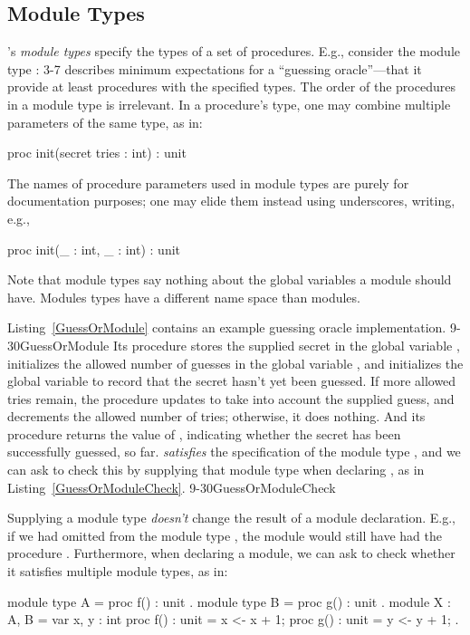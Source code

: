 \subsection{Module Types}

\EasyCrypt's \emph{module types} specify the types of a set of
procedures.  E.g., consider the module type  :
 {3-7}{}  describes
minimum expectations for a ``guessing oracle''---that it provide at
least procedures with the specified types.  The order of the
procedures in a module type is irrelevant. In a procedure's type, one
may combine multiple parameters of the same type, as in:
\begin{easycrypt}{}{}
proc init(secret tries : int) : unit
\end{easycrypt}
The names of procedure parameters used in module types
are purely for documentation purposes; one may elide them instead
using underscores, writing, e.g.,
\begin{easycrypt}{}{}
proc init(_ : int, _ : int) : unit
\end{easycrypt}
Note that module types say nothing about the global variables a module
should have. Modules types have a different name space than modules.

Listing~\ref{GuessOrModule} contains an example guessing oracle
implementation.   {9-30}{GuessOrModule} Its  procedure stores
the supplied secret in the global variable , initializes the
allowed number of guesses in the global variable , and
initializes the  global variable to record that the secret
hasn't yet been guessed.  If more allowed tries remain, the 
procedure updates  to take into account the supplied
guess, and decrements the allowed number of tries; otherwise, it does
nothing.  And its  procedure returns the value of
, indicating whether the secret has been successfully
guessed, so far.
 \emph{satisfies} the specification of the
module type , and we can ask \EasyCrypt to check this by
supplying that module type when declaring , as in
Listing~\ref{GuessOrModuleCheck}.
 {9-30}{GuessOrModuleCheck}

Supplying a module type \emph{doesn't} change the result of a module
declaration. E.g., if we had omitted  from the module type
, the module  would still have had the procedure
. Furthermore, when declaring a module, we can ask
\EasyCrypt to check whether it satisfies multiple module types, as
in:
\begin{easycrypt}{}{}
module type A = { proc f() : unit }.
module type B = { proc g() : unit }.
module X : A, B = {
  var x, y : int
  proc f() : unit = { x <- x + 1; }
  proc g() : unit = { y <- y + 1; }
}.
\end{easycrypt}

